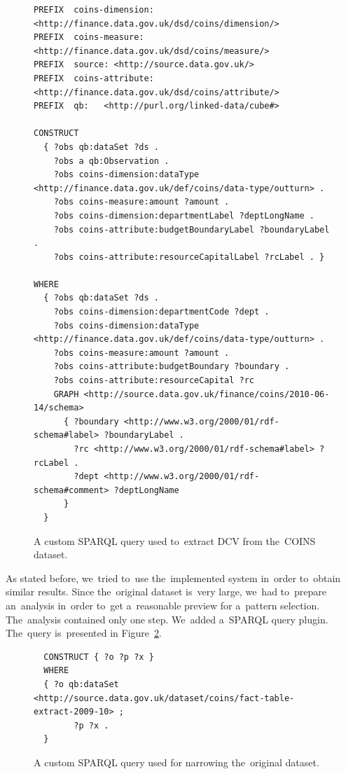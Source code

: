 \begin{figure}
  \scriptsize
\begin{verbatim}
PREFIX  coins-dimension: <http://finance.data.gov.uk/dsd/coins/dimension/>
PREFIX  coins-measure: <http://finance.data.gov.uk/dsd/coins/measure/>
PREFIX  source: <http://source.data.gov.uk/>
PREFIX  coins-attribute: <http://finance.data.gov.uk/dsd/coins/attribute/>
PREFIX  qb:   <http://purl.org/linked-data/cube#>

CONSTRUCT 
  { ?obs qb:dataSet ?ds .
    ?obs a qb:Observation .
    ?obs coins-dimension:dataType <http://finance.data.gov.uk/def/coins/data-type/outturn> .
    ?obs coins-measure:amount ?amount .
    ?obs coins-dimension:departmentLabel ?deptLongName .
    ?obs coins-attribute:budgetBoundaryLabel ?boundaryLabel .
    ?obs coins-attribute:resourceCapitalLabel ?rcLabel . }

WHERE
  { ?obs qb:dataSet ?ds .
    ?obs coins-dimension:departmentCode ?dept .
    ?obs coins-dimension:dataType <http://finance.data.gov.uk/def/coins/data-type/outturn> .
    ?obs coins-measure:amount ?amount .
    ?obs coins-attribute:budgetBoundary ?boundary .
    ?obs coins-attribute:resourceCapital ?rc
    GRAPH <http://source.data.gov.uk/finance/coins/2010-06-14/schema>
      { ?boundary <http://www.w3.org/2000/01/rdf-schema#label> ?boundaryLabel .
        ?rc <http://www.w3.org/2000/01/rdf-schema#label> ?rcLabel .
        ?dept <http://www.w3.org/2000/01/rdf-schema#comment> ?deptLongName
      }
  }
\end{verbatim}
\caption{A custom SPARQL query used to~extract DCV from the~COINS dataset.}
\label{fig:custom-coins-query}
\end{figure}

As stated before, we~tried to~use the~implemented system in~order to~obtain 
similar results. Since the~original dataset is~very large, we~had to~prepare an~analysis in~order to~get a~reasonable preview for a~pattern selection. The~analysis contained only one step. We~added a~SPARQL query plugin. The~query is~presented
in Figure~\ref{fig:coins-query-narrow}.

\begin{figure}
  \scriptsize
\begin{verbatim}
  CONSTRUCT { ?o ?p ?x }
  WHERE
  { ?o qb:dataSet <http://source.data.gov.uk/dataset/coins/fact-table-extract-2009-10> ;
        ?p ?x .
  }
\end{verbatim}
\caption{A custom SPARQL query used for narrowing the~original dataset.}
\label{fig:coins-query-narrow}
\end{figure}

